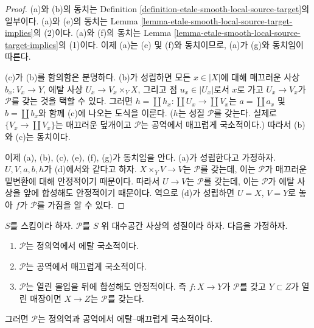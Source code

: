 \begin{proof}
(a)와 (b)의 동치는 Definition
\ref{definition-etale-smooth-local-source-target}의 일부이다. (a)와 (e)의
동치는 Lemma \ref{lemma-etale-smooth-local-source-target-implies}의 (2)이다.
(a)와 (f)의 동치는 Lemma
\ref{lemma-etale-smooth-local-source-target-implies}의 (1)이다. 이제 (a)는
(e) 및 (f)와 동치이므로,
(a)가 (g)와 동치임이 따른다.

\medskip\noindent
(c)가 (b)를 함의함은 분명하다. (b)가 성립하면 모든 $x\in|X|$에 대해
매끄러운 사상
$b_x:V_x\to Y$, 에탈 사상 $U_x\to V_x\times_YX$, 그리고 점
$u_x\in|U_x|$로서 $x$로 가고 $U_x\to V_x$가 $\mathcal{P}$를 갖는 것을
택할 수 있다. 그러면
$h=\coprod h_x:\coprod U_x\to\coprod V_x$는 $a=\coprod a_x$ 및
$b=\coprod b_x$와 함께 (c)에 나오는 도식을 이룬다. ($h$는 성질
$\mathcal{P}$를 갖는다. 실제로 $\{V_x\to\coprod V_x\}$는 매끄러운
덮개이고 $\mathcal{P}$는 공역에서 매끄럽게 국소적이다.) 따라서 (b)와
(c)는 동치이다.

\medskip\noindent
이제 (a), (b), (c), (e), (f), (g)가 동치임을 안다. (a)가 성립한다고
가정하자. $U,V,a,b,h$가 (d)에서와 같다고 하자. $X\times_YV\to V$는
$\mathcal{P}$를 갖는데, 이는 $\mathcal{P}$가 매끄러운 밑변환에 대해
안정적이기 때문이다. 따라서 $U\to V$는 $\mathcal{P}$를 갖는데, 이는
$\mathcal{P}$가 에탈 사상을 앞에 합성해도 안정적이기 때문이다. 역으로
(d)가 성립하면 $U=X$, $V=Y$로 놓아 $f$가 $\mathcal{P}$를 가짐을 알 수
있다.
\end{proof}

\begin{lemma}
\label{lemma-etale-smooth-local-source-target}
$S$를 스킴이라 하자. $\mathcal{P}$를 $S$ 위 대수공간 사상의 성질이라
하자. 다음을 가정하자.
\begin{enumerate}
\item $\mathcal{P}$는 정의역에서 에탈 국소적이다.
\item $\mathcal{P}$는 공역에서 매끄럽게 국소적이다.
\item $\mathcal{P}$는 열린 몰입을 뒤에 합성해도 안정적이다. 즉
$f:X\to Y$가 $\mathcal{P}$를 갖고 $Y\subset Z$가 열린 매장이면
$X\to Z$는 $\mathcal{P}$를 갖는다.
\end{enumerate}
그러면 $\mathcal{P}$는 정의역과 공역에서 에탈--매끄럽게 국소적이다.
\end{lemma}

